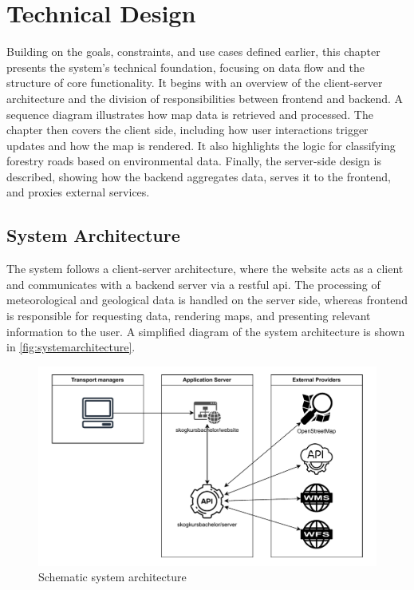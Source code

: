 \chapter{Technical Design}\label{chap:technicaldesign}

Building on the goals, constraints, and use cases defined earlier, this chapter presents the system's technical foundation, focusing on data flow and the structure of core functionality. It begins with an overview of the client-server architecture and the division of responsibilities between frontend and backend. A sequence diagram illustrates how map data is retrieved and processed. The chapter then covers the client side, including how user interactions trigger updates and how the map is rendered. It also highlights the logic for classifying forestry roads based on environmental data. Finally, the server-side design is described, showing how the backend aggregates data, serves it to the frontend, and proxies external services.


\section{System Architecture}\label{sec:systemarchitecture}

The system follows a client-server architecture, where the website acts as a client and communicates with a backend server via a \acrshort{rest}ful \acrshort{api}. The processing of meteorological and geological data is handled on the server side, whereas frontend is responsible for requesting data, rendering maps, and presenting relevant information to the user. A simplified diagram of the system architecture is shown in \autoref{fig:systemarchitecture}.

\begin{figure}[h]
    \centering
    \includegraphics[width=1\linewidth]{figures/systemdesign.pdf}
    \caption{Schematic system architecture}
    \label{fig:systemarchitecture}
\end{figure}

